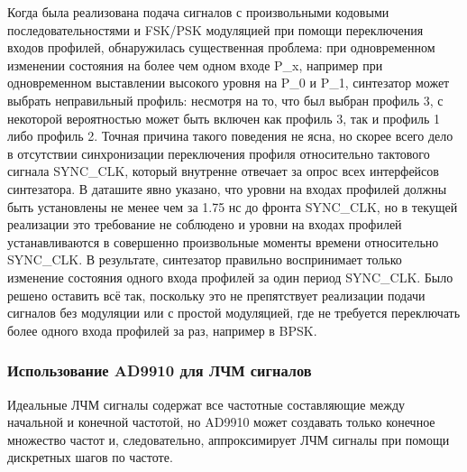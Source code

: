 \documentclass[rusmathsym, eqnumwithinsec, amspack, hyperref]{bomgost}
\begin{document}
Когда была реализована подача сигналов с произвольными кодовыми последовательностями и FSK/PSK модуляцией при помощи переключения входов профилей, обнаружилась существенная проблема: при одновременном изменении состояния на более чем одном входе P\_x, например при одновременном выставлении высокого уровня на P\_0 и P\_1, синтезатор может выбрать неправильный профиль: несмотря на то, что был выбран профиль 3, с некоторой вероятностью может быть включен как профиль 3, так и профиль 1 либо профиль 2. Точная причина такого поведения не ясна, но скорее всего дело в отсутствии синхронизации переключения профиля относительно тактового сигнала SYNC\_CLK, который внутренне отвечает за опрос всех интерфейсов синтезатора. В даташите явно указано, что уровни на входах профилей должны быть установлены не менее чем за 1.75 нс до фронта SYNC\_CLK, но в текущей реализации это требование не соблюдено и уровни на входах профилей устанавливаются в совершенно произвольные моменты времени относительно SYNC\_CLK. В результате, синтезатор правильно воспринимает только изменение состояния одного входа профилей за один период SYNC\_CLK. Было решено оставить всё так, поскольку это не препятствует реализации подачи сигналов без модуляции или с простой модуляцией, где не требуется переключать более одного входа профилей за раз, например в BPSK.

\subsubsection{Использование AD9910 для ЛЧМ сигналов}

Идеальные ЛЧМ сигналы содержат все частотные составляющие между начальной и конечной частотой, но AD9910 может создавать только конечное множество частот и, следовательно, аппроксимирует ЛЧМ сигналы при помощи дискретных шагов по частоте.
\end{document}
